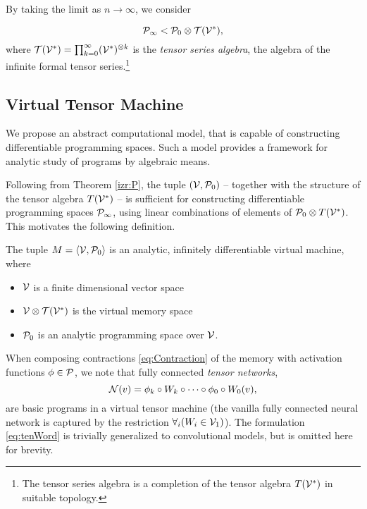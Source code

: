 By taking the limit as $n\to \infty$, we consider 
  
  \begin{equation}
  \label{eq:P_algebra}
        \mathcal{P}_\infty < \mathcal{P}_0\otimes \mathcal{T}(\mathcal{V}^*),
  \end{equation}
where $\mathcal{T}(\mathcal{V}^*)=\prod_{k=0}^\infty (\mathcal{V}^*)^{\otimes k}$ is the \emph{tensor series
  algebra}, the algebra of the infinite formal tensor series.\footnote{The
  tensor series algebra is a completion of the tensor algebra $T(\mathcal{V}^*)$ in suitable topology.}

\subsection{Virtual Tensor Machine}

We propose an abstract computational model, that is capable of constructing differentiable programming spaces. Such a model provides a
framework for analytic study of programs by algebraic means. 

Following from Theorem \ref{izr:P}, the tuple $(\mathcal{V}, \mathcal{P}_0)$ -- together with the structure of the tensor algebra $T(\mathcal{V}^*)$ -- is sufficient for constructing differentiable programming spaces $\mathcal{P}_\infty$, using linear combinations of elements of $\mathcal{P}_0\otimes T(\mathcal{V}^*)$. This motivates the following definition.

\begin{definition}\label{def:analyticMachine}
The tuple $M=\langle \mathcal{V},\mathcal{P}_0\rangle$ is an analytic, infinitely  differentiable virtual machine, where
   
    \begin{itemize}
    \item
    $\mathcal{V}$ is a finite dimensional vector space
    \item
    $\mathcal{V}\otimes \mathcal{T}(\mathcal{V}^*)$ is the virtual memory space
    \item
    $\mathcal{P}_0$ is an analytic programming space over $\mathcal{V}$.
    \end{itemize}
  \end{definition}

\noindent When composing contractions \eqref{eq:Contraction} of the memory with activation functions $\phi\in\mathcal{P}$, we note that fully connected \emph{tensor networks},
\begin{equation} \label{eq:tenWord}
\mathcal{N}(v)=\phi_k\circ W_k\circ\cdots\circ\phi_0\circ W_0(v),
\end{equation}
are basic programs in a virtual tensor machine (the vanilla fully connected neural network is  captured by the restriction $\forall_i(W_i\in\mathcal{V}_1)$). The formulation \eqref{eq:tenWord} is trivially generalized to convolutional models, but is omitted here for brevity.

